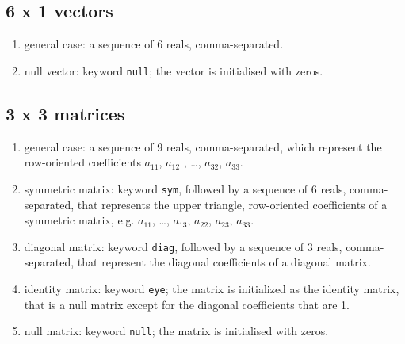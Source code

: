 \documentclass[10pt,dvips]{report}
\begin{document}
\subsection{6 x 1 vectors}
\begin{enumerate}
    \item general case: a sequence of 6 reals, comma-separated.
    \item null vector: keyword {\tt null}; the vector is initialised 
    with zeros.	
\end{enumerate}
\subsection{3 x 3 matrices}
\begin{enumerate}
    \item general case: a sequence of 9 reals, comma-separated, which
    represent the row-oriented coefficients $ a_{11} $, $ a_{12}$ ,
    \ldots, $ a_{32} $, $ a_{33} $.
    \item symmetric matrix: keyword {\tt sym}, followed by a sequence
    of 6 reals, comma-separated, that represents the upper triangle, 
    row-oriented coefficients of a symmetric matrix, 
    e.g. $ a_{11} $, \ldots , $ a_{13} $, $ a_{22} $, $ a_{23} $, $ a_{33} $.
    \item diagonal matrix: keyword {\tt diag}, followed by a sequence
    of 3 reals, comma-separated, that represent the diagonal coefficients 
    of a diagonal matrix.
    \item identity matrix: keyword {\tt eye}; the matrix is initialized
    as the identity matrix, that is a null matrix except for the diagonal 
    coefficients that are 1.
    \item null matrix: keyword {\tt null}; the matrix is initialised 
    with zeros.
\end{enumerate}
\end{document}
